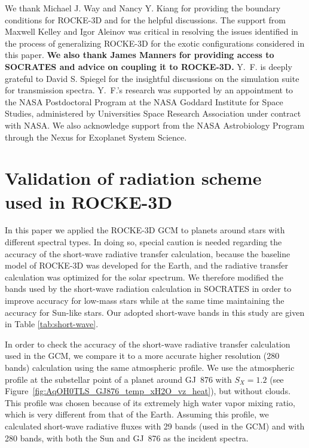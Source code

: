 \documentclass[11pt,numberedappendix,twocolappendix,]{emulateapj}
\def\modelE{ROCKE-3D}
\def\wv{water vapor}
\def\revise#1{{\bf #1}}
\begin{document}
\acknowledgments
We thank Michael J. Way and Nancy Y. Kiang for providing the boundary conditions for \modelE{} and for the helpful discussions. 
The support from Maxwell Kelley and Igor Aleinov was critical in resolving the issues identified in the process of generalizing \modelE{} for the exotic configurations considered in this paper. 
\revise{We also thank James Manners for providing access to SOCRATES and advice on coupling it to \modelE{}.}
Y.~F. is deeply grateful to David S. Spiegel for the insightful discussions on the simulation suite for transmission spectra. 
Y.~F.'s research was supported by an appointment to the NASA Postdoctoral Program at the NASA Goddard Institute for Space Studies, administered by Universities Space Research Association under contract with NASA. 
We also acknowledge support from the NASA Astrobiology Program through the Nexus for Exoplanet System Science.




\appendix


\section{Validation of radiation scheme\\used in \modelE{} }
\label{ap:radiation}

In this paper we applied the ROCKE-3D GCM to planets around stars with different spectral types. 
In doing so, special caution is needed regarding the accuracy of the short-wave radiative transfer calculation, because the baseline model of ROCKE-3D was  developed for the Earth, and the radiative transfer calculation was optimized for the solar spectrum. 
We therefore modified the bands used by the short-wave radiation calculation in SOCRATES in order to improve accuracy for low-mass stars while at the same time maintaining the accuracy for Sun-like stars.
Our adopted short-wave bands in this study are given in Table \ref{tab:short-wave}.

In order to check the accuracy of the short-wave radiative transfer calculation used in the GCM, we compare it to a more accurate higher resolution (280 bands) calculation using the same atmospheric profile. 
We use the atmospheric profile at the substellar point of a planet around GJ~876 with $S_X=1.2$ (see Figure~\ref{fig:AqOH0TLS_GJ876_temp_xH2O_vz_heat}), but without clouds. 
This profile was chosen because of its extremely high \wv{} mixing ratio, which is very different from that of the Earth. 
Assuming this profile, we calculated short-wave radiative fluxes with 29 bands (used in the GCM) and with 280 bands, with both the Sun and GJ~876 as the incident spectra.
\end{document}
